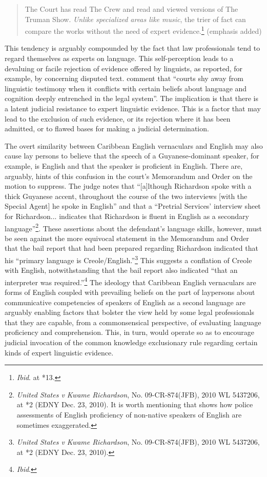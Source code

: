 \documentclass[output=paper,colorlinks,citecolor=brown]{langscibook}
\begin{document}
\begin{quote}
    The Court has read The Crew and read and viewed versions of The Truman Show. \textit{Unlike specialized areas like music}, the trier of fact can compare the works without the need of expert evidence.\footnote{\emph{Ibid}. at *13. } (emphasis added)
\end{quote}


This tendency is arguably compounded by the fact that law professionals tend to regard themselves as experts on language. This self-perception leads to a devaluing or facile rejection of evidence offered by linguists, as reported, for example, by \citet[300]{Coulthard1997-2013} concerning disputed text. \citet[223]{TiersmaSolan2002} comment that “courts shy away from linguistic testimony when it conflicts with certain beliefs about language and cognition deeply entrenched in the legal system”. The implication is that there is a latent judicial resistance to expert linguistic evidence. This is a factor that may lead to the exclusion of such evidence, or its rejection where it has been admitted, or to flawed bases for making a judicial determination.  

The overt similarity between Caribbean English vernaculars and English may also cause lay persons to believe that the speech of a Guyanese-dominant speaker, for example, is English and that the speaker is proficient in English. There are, arguably, hints of this confusion in the court’s Memorandum and Order on the motion to suppress. The judge notes that “[a]lthough Richardson spoke with a thick Guyanese accent, throughout the course of the two interviews [with the Special Agent] he spoke in English” and that a “Pretrial Services’ interview sheet for Richardson... indicates that Richardson is fluent in English as a secondary language”\footnote{\emph{United States v Kwame Richardson}, No. 09-CR-874(JFB), 2010 WL 5437206, at *2 (EDNY Dec. 23, 2010). It is worth mentioning that \citet{English_Fiona2010} shows how police assessments of English proficiency of non-native speakers of English are sometimes exaggerated.}. These assertions about the defendant’s language skills, however, must be seen against the more equivocal statement in the Memorandum and Order that the bail report that had been prepared regarding Richardson indicated that his “primary language is Creole/English.”\footnote{\emph{United States v Kwame Richardson}, No. 09-CR-874(JFB), 2010 WL 5437206, at *2 (EDNY Dec. 23, 2010).} This suggests a conflation of Creole with English, notwithstanding that the bail report also indicated “that an interpreter was required.”\footnote{\emph{Ibid}.} The ideology that Caribbean English vernaculars are forms of English coupled with prevailing beliefs on the part of laypersons about communicative competencies of speakers of English as a second language are arguably enabling factors that bolster the view held by some legal professionals that they are capable, from a commonsensical perspective, of evaluating language proficiency and comprehension. This, in turn, would operate so as to encourage judicial invocation of the common knowledge exclusionary rule regarding certain kinds of expert linguistic evidence.
\end{document}
